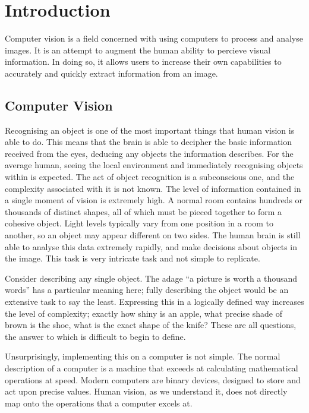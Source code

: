 \documentclass[../main.tex]{subfiles}
\begin{document}
  \section{Introduction}
    Computer vision is a field concerned with using computers to process and analyse images. 
    It is an attempt to augment the human ability to percieve visual information.
    In doing so, it allows users to increase their own capabilities to accurately and quickly extract information from an image.
  
    \subsection{Computer Vision}
    Recognising an object is one of the most important things that human vision is able to do.
    This means that the brain is able to decipher the basic information received from the eyes, deducing any objects the information describes.
    For the average human, seeing the local environment and immediately recognising objects within is expected.
    The act of object recognition is a subconscious one, and the complexity associated with it is not known.
    The level of information contained in a single moment of vision is extremely high.
    A normal room contains hundreds or thousands of distinct shapes, all of which must be pieced together to form a cohesive object.
    Light levels typically vary from one position in a room to another, so an object may appear different on two sides.
    The human brain is still able to analyse this data extremely rapidly, and make decisions about objects in the image.
    This task is very intricate task and not simple to replicate.

    Consider describing any single object.
    The adage ``a picture is worth a thousand words'' has a particular meaning here; fully describing the object would be an extensive task to say the least.
    Expressing this in a logically defined way increases the level of complexity; exactly how shiny is an apple, what precise shade of brown is the shoe, what is the exact shape of the knife?
    These are all questions, the answer to which is difficult to begin to define.

    Unsurprisingly, implementing this on a computer is not simple.
    The normal description of a computer is a machine that exceeds at calculating mathematical operations at speed.
    Modern computers are binary devices, designed to store and act upon precise values.
    Human vision, as we understand it, does not directly map onto the operations that a computer excels at.
    
\end{document}
